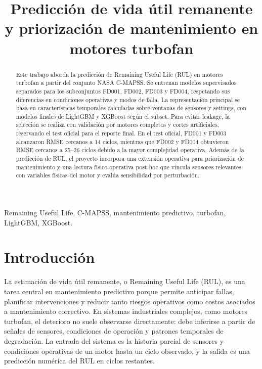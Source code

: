 \documentclass[conference, a4paper]{IEEEtran}
\begin{document}
\title{Predicción de vida útil remanente y priorización de mantenimiento en motores turbofan}


\author{
\and
{}
}
\maketitle

\begin{abstract}
Este trabajo aborda la predicción de Remaining Useful Life (RUL) en motores turbofan a partir del conjunto NASA C-MAPSS. Se entrenan modelos supervisados separados para los subconjuntos FD001, FD002, FD003 y FD004, respetando sus diferencias en condiciones operativas y modos de falla. La representación principal se basa en características temporales calculadas sobre ventanas de sensores y settings, con modelos finales de LightGBM y XGBoost según el subset. Para evitar leakage, la selección se realiza con validación por motores completos y cortes artificiales, reservando el test oficial para el reporte final. En el test oficial, FD001 y FD003 alcanzaron RMSE cercanos a 14 ciclos, mientras que FD002 y FD004 obtuvieron RMSE cercanos a 25--26 ciclos debido a la mayor complejidad operativa. Además de la predicción de RUL, el proyecto incorpora una extensión operativa para priorización de mantenimiento y una lectura físico-operativa post-hoc que vincula sensores relevantes con variables físicas del motor y evalúa sensibilidad por perturbación.
\end{abstract}

\begin{IEEEkeywords}
Remaining Useful Life, C-MAPSS, mantenimiento predictivo, turbofan, LightGBM, XGBoost.
\end{IEEEkeywords}

\section{Introducción}
La estimación de vida útil remanente, o Remaining Useful Life (RUL), es una tarea central en mantenimiento predictivo porque permite anticipar fallas, planificar intervenciones y reducir tanto riesgos operativos como costos asociados a mantenimiento correctivo. En sistemas industriales complejos, como motores turbofan, el deterioro no suele observarse directamente: debe inferirse a partir de señales de sensores, condiciones de operación y patrones temporales de degradación. La entrada del sistema es la historia parcial de sensores y condiciones operativas de un motor hasta un ciclo observado, y la salida es una predicción numérica del RUL en ciclos restantes.
\end{document}
